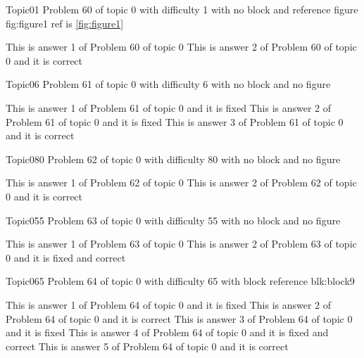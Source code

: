 \documentclass[master]{exam}
\begin{document}
\begin{problem}{Topic0}{1}
	Problem 60 of topic 0 with difficulty 1 with no block and reference figure fig:figure1 ref is \ref{fig:figure1}
	\begin{answers}
		\answer This is answer 1 of Problem 60 of topic 0 
		\answer[correct] This is answer 2 of Problem 60 of topic 0 and it is correct
	\end{answers}
\end{problem}

\begin{problem}{Topic0}{6}
	Problem 61 of topic 0 with difficulty 6 with no block and no figure
	\begin{answers}
		\answer[fixed] This is answer 1 of Problem 61 of topic 0 and it is fixed
		\answer[fixed] This is answer 2 of Problem 61 of topic 0 and it is fixed
		\answer[correct] This is answer 3 of Problem 61 of topic 0 and it is correct
	\end{answers}
\end{problem}

\begin{problem}{Topic0}{80}
	Problem 62 of topic 0 with difficulty 80 with no block and no figure
	\begin{answers}
		\answer This is answer 1 of Problem 62 of topic 0 
		\answer[correct] This is answer 2 of Problem 62 of topic 0 and it is correct
	\end{answers}
\end{problem}

\begin{problem}{Topic0}{55}
	Problem 63 of topic 0 with difficulty 55 with no block and no figure
	\begin{answers}
		\answer This is answer 1 of Problem 63 of topic 0 
		 This is answer 2 of Problem 63 of topic 0 and it is fixed and correct
	\end{answers}
\end{problem}

\begin{problem}[requires=blk:block9]{Topic0}{65}
	Problem 64 of topic 0 with difficulty 65 with block reference blk:block9
	\begin{answers}
		\answer[fixed] This is answer 1 of Problem 64 of topic 0 and it is fixed
		\answer[correct] This is answer 2 of Problem 64 of topic 0 and it is correct
		\answer[fixed] This is answer 3 of Problem 64 of topic 0 and it is fixed
		 This is answer 4 of Problem 64 of topic 0 and it is fixed and correct
		\answer[correct] This is answer 5 of Problem 64 of topic 0 and it is correct
	\end{answers}
\end{problem}
\end{document}
